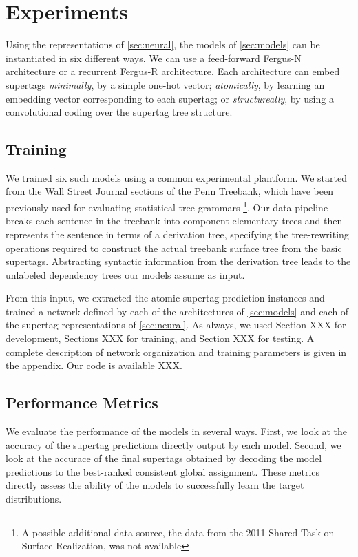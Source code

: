 \documentclass[11pt]{article}
\begin{document}
\section{Experiments}
\label{sec:expt}

Using the representations of \ref{sec:neural}, the models of
\ref{sec:models} can be instantiated in six different ways.  We can
use a feed-forward Fergus-N architecture or a recurrent Fergus-R
architecture.  Each architecture can embed supertags \emph{minimally},
by a simple one-hot vector; \emph{atomically}, by learning an
embedding vector corresponding to each supertag; or
\emph{structureally}, by using a convolutional coding over the
supertag tree structure.

\subsection{Training}

We trained six such models using a common experimental plantform.  We
started from the Wall Street Journal sections of the Penn Treebank,
which have been previously used for evaluating statistical tree
grammars \cite{chiang2000statistical}\footnote{A possible additional
  data source, the data from the 2011 Shared Task on Surface
  Realization, was not available}.
%
Our data pipeline breaks each sentence in the treebank into component
elementary trees and then represents the sentence in terms of a
derivation tree, specifying the tree-rewriting operations required to
construct the actual treebank surface tree from the basic supertags.
%
Abstracting syntactic information from the derivation tree leads to
the unlabeled dependency trees our models assume as input.

From this input, we extracted the atomic supertag prediction instances
and trained a network defined by each of the architectures of
\ref{sec:models} and each of the supertag representations of
\ref{sec:neural}.  As always, we used Section XXX for development,
Sections XXX for training, and Section XXX for testing.  A complete
description of network organization and training parameters is given
in the appendix.  Our code is available XXX.

\subsection{Performance Metrics}

We evaluate the performance of the models in several ways.  First, we
look at the accuracy of the supertag predictions directly output by
each model.  Second, we look at the accurace of the final supertags
obtained by decoding the model predictions to the best-ranked
consistent global assignment.  These metrics directly assess the
ability of the models to successfully learn the target distributions.
\end{document}
